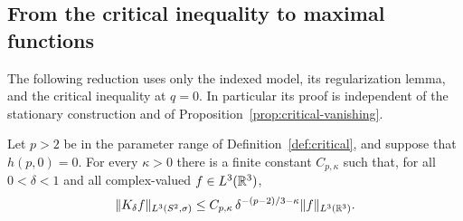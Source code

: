 \subsection{From the critical inequality to maximal functions}

The following reduction uses only the indexed model, its regularization
lemma, and the critical inequality at \(q=0\).  In particular its proof
is independent of the stationary construction and of
Proposition~\ref{prop:critical-vanishing}.

\begin{proposition}
\label{prop:maximal-reduction}
Let \(p>2\) be in the parameter range of Definition~\ref{def:critical},
and suppose that \(h(p,0)=0\).  For every \(\kappa>0\) there is a finite
constant \(C_{p,\kappa}\) such that, for all \(0<\delta<1\) and all
complex-valued \(f\in L^3(\mathbb R^3)\),
\begin{equation}
  \|K_\delta f\|_{L^3(S^2,\sigma)}
    \le C_{p,\kappa}\,
       \delta^{-(p-2)/3-\kappa}\|f\|_{L^3(\mathbb R^3)}.
  \label{eq:closure-quantitative-maximal}
\end{equation}
\end{proposition}

